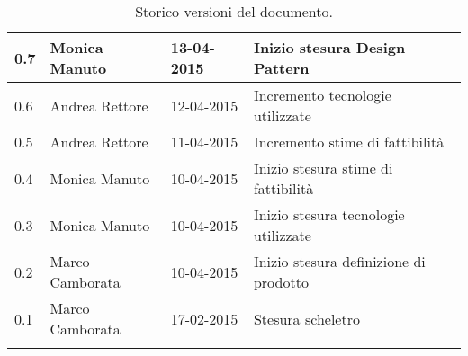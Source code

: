 \begin{longtable}{|l|l|l|p{}|}
\hline
0.7 & Monica Manuto & 13-04-2015 & Inizio stesura Design Pattern \\
\hline
0.6 & Andrea Rettore & 12-04-2015 & Incremento tecnologie utilizzate \\
\hline
0.5 & Andrea Rettore & 11-04-2015 & Incremento stime di fattibilità \\
\hline
0.4 & Monica Manuto & 10-04-2015 & Inizio stesura stime di fattibilità \\
\hline
0.3 & Monica Manuto & 10-04-2015 & Inizio stesura tecnologie utilizzate \\
\hline
0.2 & Marco Camborata & 10-04-2015 & Inizio stesura definizione di prodotto \\
\hline
0.1 & Marco Camborata & 17-02-2015 & Stesura scheletro \\
\hline
\caption{Storico versioni del documento.}
\end{longtable}
